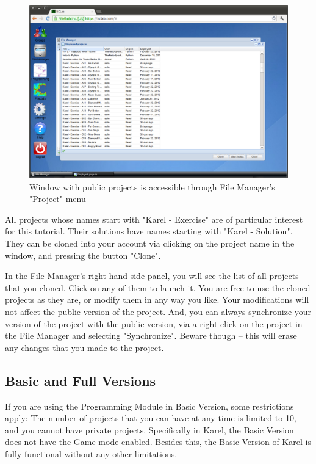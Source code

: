 \documentclass[article,A4,12pt]{llncs}
\begin{document}
\begin{figure}[!ht]
\begin{center}
\includegraphics[width=\textwidth]{img/cloning.png}
\end{center}
\caption{Window with public projects is accessible through File Manager's "Project" menu}
\label{fig:cloning}
\end{figure}
\noindent
All projects whose names start with "Karel - Exercise" are of particular interest 
for this tutorial. Their solutions have names starting with "Karel - Solution". 
They can be cloned into your account via clicking on the project name in the window, 
and pressing the button "Clone".

In the File Manager's right-hand side panel, you will see the list of all 
projects that you cloned. Click on any of them to launch it. You are free to 
use the cloned projects as they are, or modify them in any way you like. Your modifications 
will not affect the public version of the project. And, you can 
always synchronize your version of the project with the public version, via 
a right-click on the project in the File Manager and selecting "Synchronize".
Beware though -- this will erase any changes that you made to the project.

\subsection{Basic and Full Versions}

If you are using the Programming Module in Basic Version, some restrictions apply: The 
number of projects that you can have at any time is limited to 10, and you cannot have
private projects. Specifically in Karel, the Basic Version does not have the Game mode 
enabled. Besides this, the Basic Version of Karel is fully functional without any other 
limitations. 
\end{document}
